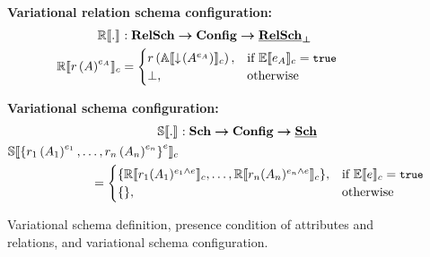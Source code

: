 \begin{figure}
%
\medskip
\textbf{Variational relation schema configuration:}
\begin{alignat*}{1}%
\orSem [] . &: \vRelSchSet \totype \confSet  \totype \maybe \pRelSchSet\\
%
\orSem {\vRelDef [\vRel] [\dimMeta_\vAttList]} &= 
	\begin{cases}
		\vRel\left({\olSem {\pushIn { \annot [\dimMeta_\vAttList] \vAttList}}}\right), &\If \fSem {\dimMeta_\vAttList} = \t\\
		\bot, &\Otherwise
	\end{cases}
\end{alignat*}

%
\medskip
\textbf{Variational schema configuration:}
\begin{alignat*}{1}%
\osSem [] . &: \vSchSet \totype \confSet \totype \pSchSet\\
%
\osSem {\annot [\dimMeta] {\setDef {\vRelDefNum 1, \ldots, \vRelDefNum \numRels}}}\\
&\hspace{-70pt}= \begin{cases}
                 \setDef {\orSem {\vRel_1( \vAttList_1 )^{\dimMeta_1 {\wedge \dimMeta}} }, \ldots, 
                 \orSem {\vRel_\numRels( \vAttList_\numRels)^{\dimMeta_\numRels {\wedge \dimMeta}} }},	
                         & \If \fSem {\dimMeta } =\t \\	
        \setDef{}, & \text{otherwise}
	\end{cases}
\end{alignat*}


\caption[Variational schema definition and configuration]{Variational schema definition, presence condition of attributes and relations, and variational schema configuration.}
\label{fig:vsch}
\end{figure} 
